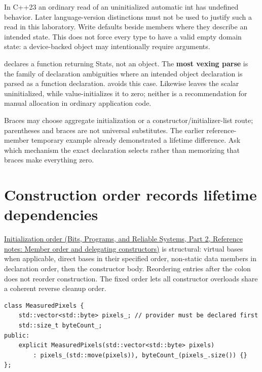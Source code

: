In C++23 an ordinary read of an uninitialized automatic int has undefined behavior. Later language-version distinctions must not be used to justify such a read in this laboratory. Write defaults beside members where they describe an intended state. This does not force every type to have a valid empty domain state: a device-backed object may intentionally require arguments.

 declares a function returning Stats, not an object. The \textbf{most vexing parse} is the family of declaration ambiguities where an intended object declaration is parsed as a function declaration.  avoids this case. Likewise  leaves the scalar uninitialized, while  value-initializes it to zero; neither is a recommendation for manual allocation in ordinary application code.

Braces may choose aggregate initialization or a constructor/initializer-list route; parentheses and braces are not universal substitutes. The earlier reference-member temporary example already demonstrated a lifetime difference. Ask which mechanism the exact declaration selects rather than memorizing that braces make everything zero.

\section{Construction order records lifetime dependencies}\label{05-engine-i-ch003-construction-order-records-lifetime-dependencies}

\hypertarget{05-engine-i-ch003-construction-order-records-lifetime-dependencies}{}

\href{../01-Bits-Programs-and-Reliable-Systems-P02/main.pdf\#appendix-3cb49709605a}{Initialization order (Bits, Programs, and Reliable Systems, Part 2, Reference notes: Member order and delegating constructors)} is structural: virtual bases when applicable, direct bases in their specified order, non-static data members in declaration order, then the constructor body. Reordering entries after the colon does not reorder construction. The fixed order lets all constructor overloads share a coherent reverse cleanup order.

\begin{verbatim}
class MeasuredPixels {
    std::vector<std::byte> pixels_; // provider must be declared first
    std::size_t byteCount_;
public:
    explicit MeasuredPixels(std::vector<std::byte> pixels)
        : pixels_(std::move(pixels)), byteCount_(pixels_.size()) {}
};
\end{verbatim}

